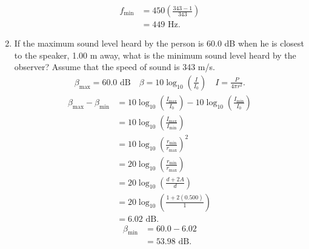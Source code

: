\documentclass{zc-ust-hw}
\begin{document}
\begin{enumerate}[label=(\alph*)]
\begin{align}
      f_{\text{min}} &= 450 \left( \frac{343 - 1}{343} \right) \\
                     &= 449 \text{ Hz}
    .\end{align}
  \item If the maximum sound level heard by the person is 60.0 dB when he is
    closest to the speaker, 1.00 m away, what is the minimum sound level
    heard by the observer? Assume that the speed of sound is 343 m/s.
    \begin{align}
      \beta_{\text{max}} = 60.0 \text{ dB} \quad \beta=10 \log_{10}\left(\frac{I}{I_0}\right) \quad I = \frac{P}{4\pi r^2}
    .\end{align}
    \begin{align}
      \beta_{\text{max}} - \beta_{\text{min}} &= 10 \log_{10}\left(\frac{I_{\text{max}}}{I_0}\right) - 10 \log_{10}\left(\frac{I_{\text{min}}}{I_0}\right) \\
                                              &= 10 \log_{10}\left(\frac{I_{\text{max}}}{I_{\text{min}}}\right) \\
                                              &= 10 \log_{10} \left( \frac{r_{\text{min}}}{r_{\text{max}}} \right)^2 \\
                                              &= 20 \log_{10} \left( \frac{r_{\text{min}}}{r_{\text{max}}} \right) \\
                                              &= 20 \log_{10} \left( \frac{d+2A}{d} \right) \\
                                              &= 20 \log_{10} \left( \frac{1+2(0.500)}{1} \right) \\
                                              &= 6.02 \text{ dB}
    .\end{align}
    \begin{align}
      \beta_{\text{min}} &= 60.0 - 6.02 \\
                         &= 53.98 \text{ dB}
    .\end{align}
\end{enumerate}
\end{document}
